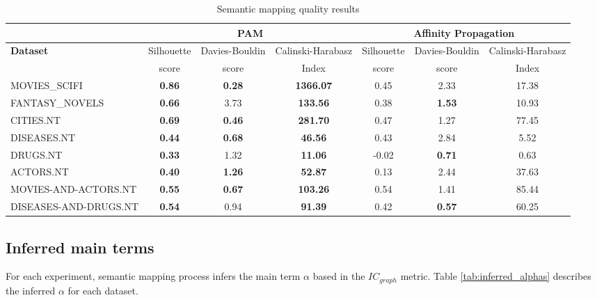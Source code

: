 \documentclass{ieeeaccess}
\begin{document}
\begin{table*}[!h]
\caption{Semantic mapping quality results}
\label{tab:semantic_map_quality}
\centering
\begin{tabular}{lcccccc}
\toprule
& \multicolumn{3}{c}{PAM} 
& \multicolumn{3}{c}{Affinity Propagation} \\
\hline
\textbf{Dataset} & 
\footnotesize
Silhouette & 
\footnotesize
Davies-Bouldin & 
\footnotesize
Calinski-Harabasz &
\footnotesize
Silhouette & 
\footnotesize
Davies-Bouldin & 
\footnotesize
Calinski-Harabasz \\
& 
\footnotesize
score 
&
\footnotesize
score &
\footnotesize
Index &
\footnotesize
score &
\footnotesize
score &
\footnotesize
Index \\
\hline
MOVIES\_SCIFI & \textbf{0.86} & \textbf{0.28} & \textbf{1366.07} & 0.45 & 2.33 & 17.38 \\
FANTASY\_NOVELS  & \textbf{0.66} & 3.73 & \textbf{133.56} & 0.38 & \textbf{1.53} & 10.93 \\
CITIES.NT & \textbf{0.69} & \textbf{0.46} & \textbf{281.70} & 0.47 & 1.27 & 77.45 \\
DISEASES.NT & \textbf{0.44} & \textbf{0.68} & \textbf{46.56} & 0.43 & 2.84 & 5.52 \\
DRUGS.NT & \textbf{0.33} & 1.32 & \textbf{11.06} & -0.02 & \textbf{0.71} & 0.63 \\
ACTORS.NT & \textbf{0.40} & \textbf{1.26} & \textbf{52.87} & 0.13 & 2.44 & 37.63 \\
MOVIES-AND-ACTORS.NT & \textbf{0.55} & \textbf{0.67} & \textbf{103.26} & 0.54 & 1.41 & 85.44 \\
DISEASES-AND-DRUGS.NT & \textbf{0.54} & 0.94 & \textbf{91.39} & 0.42 & \textbf{0.57} & 60.25 \\

\bottomrule
\end{tabular}
\label{tab1}
\end{table*}

\subsection{Inferred main terms}
For each experiment, semantic mapping process infers the
main term $\alpha$ based in the $IC_{graph}$ metric. Table
\ref{tab:inferred_alphas} describes the inferred $\alpha$ for
each dataset.
\end{document}
